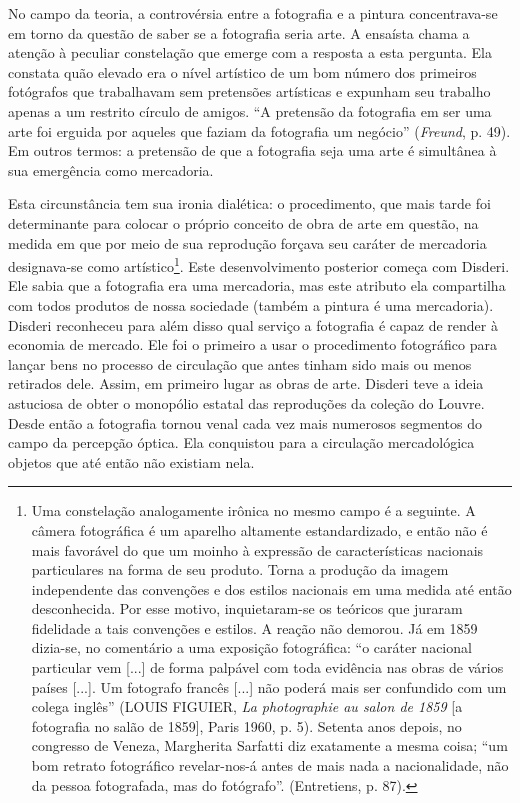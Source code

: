 No campo da teoria, a controvérsia entre a fotografia e a pintura
concentrava-se em torno da questão de saber se a fotografia seria arte.
A ensaísta chama a atenção à peculiar constelação que emerge com a
resposta a esta pergunta. Ela constata quão elevado era o nível
artístico de um bom número dos primeiros fotógrafos que trabalhavam sem
pretensões artísticas e expunham seu trabalho apenas a um restrito
círculo de amigos. ``A pretensão da fotografia em ser uma arte foi
erguida por aqueles que faziam da fotografia um negócio''
(\emph{Freund}, p. 49). Em outros termos: a pretensão de que a
fotografia seja uma arte é simultânea à sua emergência como mercadoria.

Esta circunstância tem sua ironia dialética: o procedimento, que mais
tarde foi determinante para colocar o próprio conceito de obra de arte
em questão, na medida em que por meio de sua reprodução forçava seu
caráter de mercadoria designava-se como artístico\footnote{Uma
  constelação analogamente irônica no mesmo campo é a seguinte. A câmera
  fotográfica é um aparelho altamente estandardizado, e então não é mais
  favorável do que um moinho à expressão de características nacionais
  particulares na forma de seu produto. Torna a produção da imagem
  independente das convenções e dos estilos nacionais em uma medida até
  então desconhecida. Por esse motivo, inquietaram-se os teóricos que
  juraram fidelidade a tais convenções e estilos. A reação não demorou.
  Já em 1859 dizia-se, no comentário a uma exposição fotográfica: ``o
  caráter nacional particular vem {[}...{]} de forma palpável com toda
  evidência nas obras de vários países {[}...{]}. Um fotografo francês
  {[}...{]} não poderá mais ser confundido com um colega inglês'' (LOUIS
  FIGUIER, \emph{La photographie au salon de 1859} {[}a fotografia no
  salão de 1859{]}, Paris 1960, p. 5). Setenta anos depois, no congresso
  de Veneza, Margherita Sarfatti diz exatamente a mesma coisa; ``um bom
  retrato fotográfico revelar-nos-á antes de mais nada a nacionalidade,
  não da pessoa fotografada, mas do fotógrafo''. (Entretiens, p. 87).}.
Este desenvolvimento posterior começa com Disderi. Ele sabia que a
fotografia era uma mercadoria, mas este atributo ela compartilha com
todos produtos de nossa sociedade (também a pintura é uma mercadoria).
Disderi reconheceu para além disso qual serviço a fotografia é capaz de
render à economia de mercado. Ele foi o primeiro a usar o procedimento
fotográfico para lançar bens no processo de circulação que antes tinham
sido mais ou menos retirados dele. Assim, em primeiro lugar as obras de
arte. Disderi teve a ideia astuciosa de obter o monopólio estatal das
reproduções da coleção do Louvre. Desde então a fotografia tornou venal
cada vez mais numerosos segmentos do campo da percepção óptica. Ela
conquistou para a circulação mercadológica objetos que até então não
existiam nela.

